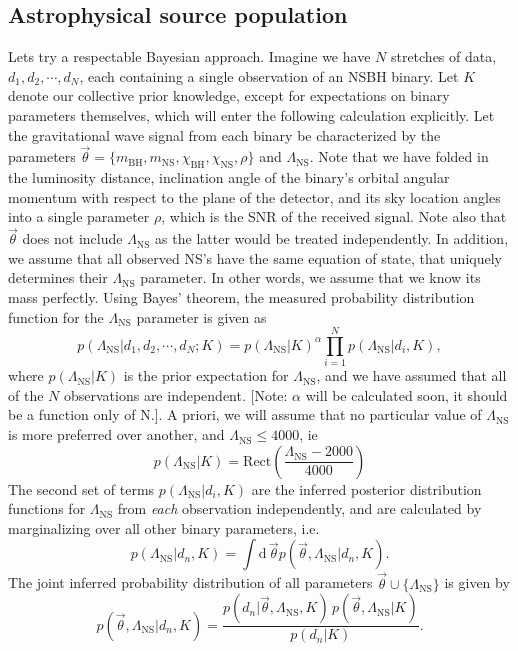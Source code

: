 \documentclass[aps,prd,amsmath,floats,floatfix, twocolumn,
superscriptaddress,nofootinbib,showpacs]{revtex4-1}
\newcommand{\D}{\mathrm{d}}
\newcommand{\lambdans}{\Lambda_\mathrm{NS}}
\newcommand{\chibh}{\chi_\mathrm{BH}}
\newcommand{\chins}{\chi_\mathrm{NS}}
\newcommand{\mbh}{m_\mathrm{BH}}
\newcommand{\mns}{m_\mathrm{NS}}
\begin{document}
\subsection{Astrophysical source population}\label{s2:astro_multiple}
% 
Lets try a respectable Bayesian approach. Imagine we have $N$ stretches of data,
$d_1, d_2, \cdots, d_N$, each containing a single observation of an NSBH binary. Let $K$
denote our collective prior knowledge, except for expectations on binary parameters
themselves, which will enter the following calculation explicitly. Let the gravitational wave
signal from each binary be characterized by the parameters 
$\vec{\theta} = \{\mbh, \mns, \chibh, \chins, \rho\}$ and $\lambdans$. Note that we have folded
in the luminosity distance, inclination angle of the binary's orbital angular momentum with
respect to the plane of the detector, and its sky location angles into a single parameter $\rho$,
which is the SNR of the received signal. Note also that $\vec{\theta}$ does not include
$\lambdans$ as the latter would be treated independently. In addition, we assume
that all observed NS's have the same equation of state, that uniquely determines their
$\lambdans$ parameter. In other words, we assume that we know its mass perfectly.
% 
Using Bayes' theorem, the measured probability distribution function for the $\lambdans$
parameter is given as
\begin{equation}\label{eq:lambdaMultiple}
 p(\lambdans | d_1, d_2, \cdots, d_N; K) = p(\lambdans | K)^{\alpha}\prod_{i=1}^N p(\lambdans | d_i, K),
\end{equation}
where $p(\lambdans|K)$ is the prior expectation for $\lambdans$, and we have assumed
that all of the $N$ observations are independent. [Note: $\alpha$ will be calculated 
soon, it should be a function only of N.]. A priori, we will assume that no particular value
of $\lambdans$ is more preferred over another, and $\lambdans\leq 4000$, ie 
$$
p(\lambdans | K) = \mathrm{Rect}\left(\frac{\lambdans-2000}{4000}\right)
$$
% 
The second set of terms $p(\lambdans | d_i, K)$ are the inferred posterior distribution
functions for $\lambdans$ from \textit{each} observation independently, and are 
calculated by marginalizing over all other binary parameters, i.e.
\begin{equation}
 p(\lambdans | d_n, K) = \int \D\, \vec{\theta} p(\vec{\theta}, \lambdans | d_n, K).
\end{equation}
The joint inferred probability distribution of all parameters $\vec{\theta}\cup\{\lambdans\}$ 
is given by
\begin{equation}
 p(\vec{\theta}, \lambdans | d_n, K) = \dfrac{p(d_n|\vec{\theta}, \lambdans, K)\,p(\vec{\theta}, \lambdans | K)}{p(d_n|K)}.
\end{equation}
\end{document}
